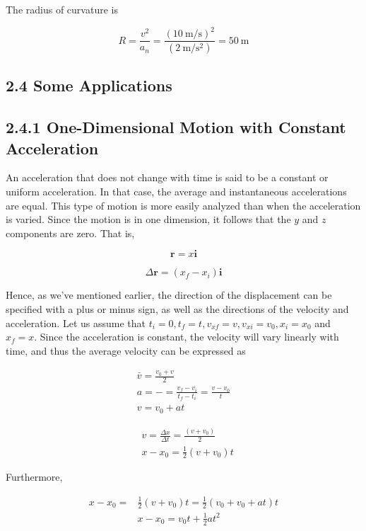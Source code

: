 \documentclass[10pt]{article}
\begin{document}
The radius of curvature is

$$
R=\frac{v^{2}}{a_{n}}=\frac{(10 \mathrm{~m} / \mathrm{s})^{2}}{\left(2 \mathrm{~m} / \mathrm{s}^{2}\right)}=50 \mathrm{~m}
$$

\subsection*{2.4 Some Applications}
\subsection*{2.4.1 One-Dimensional Motion with Constant Acceleration}
An acceleration that does not change with time is said to be a constant or uniform acceleration. In that case, the average and instantaneous accelerations are equal. This type of motion is more easily analyzed than when the acceleration is varied. Since the motion is in one dimension, it follows that the $y$ and $z$ components are zero. That is,

$$
\mathbf{r}=x \mathbf{i}
$$

$$
\Delta \mathbf{r}=\left(x_{f}-x_{i}\right) \mathbf{i}
$$

Hence, as we've mentioned earlier, the direction of the displacement can be specified with a plus or minus sign, as well as the directions of the velocity and acceleration. Let us assume that $t_{i}=0, t_{f}=t, v_{x f}=v, v_{x i}=v_{0}, x_{i}=x_{0}$ and $x_{f}=x$. Since the acceleration is constant, the velocity will vary linearly with time, and thus the average velocity can be expressed as


\begin{gather*}
\bar{v}=\frac{v_{0}+v}{2} \\
a=-=\frac{v_{f}-v_{i}}{t_{f}-t_{i}}=\frac{v-v_{0}}{t} \\
v=v_{0}+a t \tag{2.4}
\end{gather*}



\begin{align*}
& v=\frac{\Delta x}{\Delta t}=\frac{\left(v+v_{0}\right)}{2} \\
& x-x_{0}=\frac{1}{2}\left(v+v_{0}\right) t \tag{2.5}
\end{align*}


Furthermore,


\begin{align*}
x-x_{0}= & \frac{1}{2}\left(v+v_{0}\right) t=\frac{1}{2}\left(v_{0}+v_{0}+a t\right) t \\
& x-x_{0}=v_{0} t+\frac{1}{2} a t^{2} \tag{2.6}
\end{align*}
\end{document}
